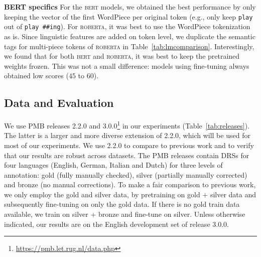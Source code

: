 \documentclass[11pt,a4paper]{article}
\newcommand{\bert}{\textsc{bert}}
\newcommand{\roberta}{\textsc{roberta}}
\newcommand{\inlineheader}[1]{\vspace{0.06cm}
\noindent\textbf{#1}\quad
}
\begin{document}
\inlineheader{BERT specifics} For the \bert{} models, we obtained the best performance by only keeping the vector of the first WordPiece per original token (e.g., only keep \texttt{play} out of \texttt{play \#\#ing}). For \roberta{}, it was best to use the WordPiece tokenization as is. Since linguistic features are added on token level, we duplicate the semantic tags for multi-piece tokens of \roberta{} in Table~\ref{tab:lmcomparison}. Interestingly, we found that for both \bert{} and \roberta{}, it was best to keep the pretrained weights frozen. This was not a small difference: models using fine-tuning always obtained low scores ($45$ to $60$).

\subsection{Data and Evaluation}
\label{sec:data}


We use PMB releases 2.2.0 and 3.0.0\footnote{\url{https://pmb.let.rug.nl/data.php}} in our experiments (Table~\ref{tab:releases}). The latter is a larger and more diverse extension of 2.2.0, which will be used for most of our experiments. We use 2.2.0 to compare to previous work and to verify that our results are robust across datasets. The PMB releases contain DRSs for four languages (English, German, Italian and Dutch) for three levels of annotation: gold (fully manually checked), silver (partially manually corrected) and bronze (no manual corrections). To make a fair comparison to previous work, we only employ the gold and silver data, by pretraining on gold $+$ silver data and subsequently fine-tuning on only the gold data. If there is no gold train data available, we train on silver $+$ bronze and fine-tune on silver. Unless otherwise indicated, our results are on the English development set of release 3.0.0.
\end{document}
